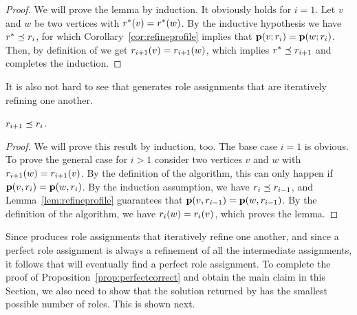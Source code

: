 \begin{proof}
We will prove the lemma by induction. 
It obviously holds for $i = 1$.
Let $v$ and $w$ be two vertices with $r^*(v) = r^*(w)$.
By the inductive hypothesis we have  $r^* \preceq r_i$,
for which
Corollary~\ref{cor:refineprofile} implies that $\prof{v; \role_i} = \prof{w; \role_i}$.
Then, by definition of \algperfect
we get $r_{i + 1}(v) = r_{i + 1}(w)$, 
which implies $r^* \preceq r_{i+1}$ 
and completes the induction.
\end{proof}

It is also not hard to see that 
\algperfect generates role ass\-ign\-ments 
that are iteratively refining one another.

\begin{lemma}
\label{lem:progress}
$r_{i + 1} \preceq r_i$.
\end{lemma}

\begin{proof}
We will prove this result by induction, too. 
The base case $i = 1$ is obvious.
To prove the general case for $i > 1$
consider two vertices $v$ and $w$ with $r_{i + 1}(w) = r_{i + 1}(v)$.
By the definition of the algorithm, 
this can only happen if $\prof{v, \role_i} = \prof{w, \role_i}$.
By the induction assumption,
we have $r_i \preceq r_{i - 1}$, and Lemma~\ref{lem:refineprofile}
guarantees that $\prof{v, \role_{i  - 1}} = \prof{w, \role_{i  - 1}}$. 
By the definition of the algorithm, 
we have $r_{i}(w) = r_{i}(v)$, which proves the lemma.
\end{proof}

Since  \algperfect  produces role assignments 
that iteratively refine one another,
and since a perfect role assignment 
is always a refinement of all the intermediate assignments,
it follows that \algperfect will eventually 
find a perfect role assignment. 
To complete the proof of Proposition~\ref{prop:perfectcorrect}
and obtain the main claim in this Section, 
we also need to show that the solution 
returned by \algperfect has the smallest possible number of roles.
This is shown next.

